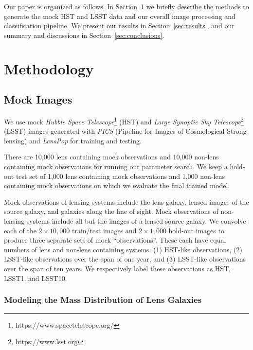 \documentclass{emulateapj}
\begin{document}
Our paper is organized as follows. In Section~\ref{sec:methods} we
briefly describe the methods to generate the mock HST and LSST data
and our overall image processing and classification pipeline. We
present our results in Section~\ref{sec:results}, and our summary and
discussions in Section~\ref{sec:conclusions}.

\section{Methodology}
\label{sec:methods}
\subsection{Mock Images}
We use mock {\em Hubble Space
  Telescope}\footnote{https://www.spacetelescope.org/} (HST) and {\em
  Large Synoptic Sky Telescope}\footnote{https://www.lsst.org} (LSST)
images generated with {\em PICS} (Pipeline for Images of Cosmological
Strong lensing) \citep{li_etal16} and {\em LensPop} \citep{collett_15}
for training and testing.

There are 10,000 lens containing mock observations and 10,000
non-lens containing mock observations for running our parameter search. 
We keep a hold-out test set of 1,000 lens containing mock observations
and 1,000 non-lens containing mock observations on which we evaluate
the final trained model.

Mock observations of lensing systems include the lens galaxy, lensed
images of the source galaxy, and galaxies along the line of sight.
Mock observations of non-lensing systems include all but the images of
a lensed source galaxy.  We convolve each of the $2\times 10,000$
train/test images and $2\times 1,000$ hold-out images to produce three
separate sets of mock ``observations''.  These each have equal numbers
of lens and non-lens containing systems: (1) HST-like observations,
(2) LSST-like observations over the span of one year, and (3)
LSST-like observations over the span of ten years.  We respectively
label these observations as HST, LSST1, and LSST10.

\subsubsection{Modeling the Mass Distribution of Lens Galaxies}
\end{document}
